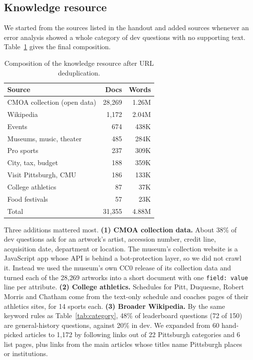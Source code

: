\documentclass[11pt]{article}
\begin{document}
\subsection{Knowledge resource}

We started from the sources listed in the handout and added sources whenever an error analysis showed a whole category of dev questions with no supporting text. Table~\ref{tab:corpus} gives the final composition.

\begin{table}[t]
  \centering
  \small
  \begin{tabular}{lrr}
    \toprule
    Source & Docs & Words \\
    \midrule
    CMOA collection (open data) & 28{,}269 & 1.26M \\
    Wikipedia & 1{,}172 & 2.04M \\
    Events & 674 & 438K \\
    Museums, music, theater & 485 & 284K \\
    Pro sports & 237 & 309K \\
    City, tax, budget & 188 & 359K \\
    Visit Pittsburgh, CMU & 186 & 133K \\
    College athletics & 87 & 37K \\
    Food festivals & 57 & 23K \\
    \midrule
    Total & 31{,}355 & 4.88M \\
    \bottomrule
  \end{tabular}
  \caption{Composition of the knowledge resource after URL deduplication.}
  \label{tab:corpus}
\end{table}

Three additions mattered most.
\textbf{(1) CMOA collection data.} About 38\% of dev questions ask for an artwork's artist, accession number, credit line, acquisition date, department or location. The museum's collection website is a JavaScript app whose API is behind a bot-protection layer, so we did not crawl it. Instead we used the museum's own CC0 release of its collection data \citep{cmoa2016collection} and turned each of the 28{,}269 artworks into a short document with one \texttt{field: value} line per attribute.
\textbf{(2) College athletics.} Schedules for Pitt, Duquesne, Robert Morris and Chatham come from the text-only schedule and coaches pages of their athletics sites, for 14 sports each.
\textbf{(3) Broader Wikipedia.} By the same keyword rules as Table~\ref{tab:category}, 48\% of leaderboard questions (72 of 150) are general-history questions, against 20\% in dev. We expanded from 60 hand-picked articles to 1{,}172 by following links out of 22 Pittsburgh categories and 6 list pages, plus links from the main articles whose titles name Pittsburgh places or institutions.
\end{document}
